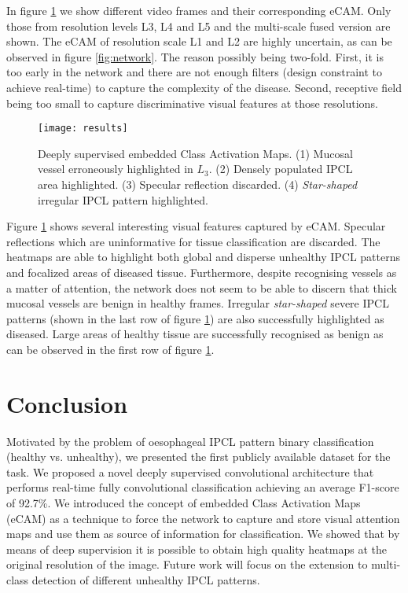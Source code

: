 \documentclass[runningheads]{llncs}
\begin{document}
In figure \ref{fig:results} we show different video frames and their corresponding eCAM. Only those from resolution levels L3, L4 and L5 and the multi-scale fused version are shown. The eCAM of resolution scale L1 and L2 are highly uncertain, as can be observed in figure \ref{fig:network}. The reason possibly being two-fold. First, it is too early in the network and there are not enough filters (design constraint to achieve real-time) to capture the complexity of the disease. Second, receptive field being too small to capture discriminative visual features at those resolutions. 

\begin{figure}[t!]
	\centering
	\texttt{[image: results]}
	\caption{Deeply supervised embedded Class Activation Maps. (1) Mucosal vessel erroneously highlighted in $L_3$. (2) Densely populated IPCL area highlighted. (3) Specular reflection discarded. (4) \textit{Star-shaped} irregular IPCL pattern highlighted.}
	\label{fig:results}
\end{figure}

Figure \ref{fig:results} shows several interesting visual features captured by eCAM. Specular reflections which are uninformative for tissue classification are discarded. The heatmaps are able to highlight both global and disperse unhealthy IPCL patterns and focalized areas of diseased tissue.  Furthermore, despite recognising vessels as a matter of attention, the network does not seem to be able to discern that thick mucosal vessels are benign in healthy frames. Irregular \textit{star-shaped} severe IPCL patterns (shown in the last row of figure \ref{fig:results}) are also successfully highlighted as diseased. Large areas of healthy tissue are successfully recognised as benign as can be observed in the first row of figure \ref{fig:results}.


\section{Conclusion}

Motivated by the problem of oesophageal IPCL pattern binary classification (healthy vs. unhealthy), we presented the first publicly available dataset for the task. We proposed a novel deeply supervised convolutional architecture that performs real-time fully convolutional classification achieving an average F1-score of 92.7\%. We introduced the concept of embedded Class Activation Maps (eCAM) as a technique to force the network to capture and store visual attention maps and use them as source of information for classification. We showed that by means of deep supervision it is possible to obtain high quality heatmaps at the original resolution of the image. Future work will focus on the extension to multi-class detection of different unhealthy IPCL patterns.




\end{document}
